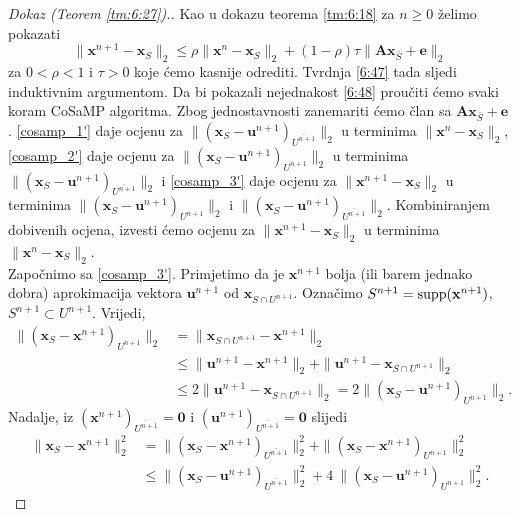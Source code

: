 \documentclass[a4paper,twoside,12pt]{memoir} %
\newcommand{\vect}[1]{\mathbf{#1}}
\renewcommand{\vec}{\vect}
\newcommand{\supp}{\text{\normalfont{supp}}}
\newcommand{\norm}[1]{\|{#1}\|}
\begin{document}
\begin{proof}[Dokaz (Teorem \ref{tm:6:27}).]
    Kao u dokazu teorema \eqref{tm:6:18} za $n \geq 0$ \v{z}elimo pokazati
    \begin{equation}\label{6:48}
        \norm{\vec x^{n+1} - \vec x_S}_2 \leq \rho \norm{\vec x^n - \vec x_S}_2 + (1-\rho)\tau \norm{\vec{Ax}_{\bar S} + \vec e}_2 
    \end{equation}
    za $0< \rho < 1$ i $\tau > 0 $ koje \'cemo kasnije odrediti. Tvrdnja \eqref{6:47} tada sljedi induktivnim argumentom. Da bi pokazali nejednakost \eqref{6:48} prou\v{c}iti \'cemo svaki koram CoSaMP algoritma. Zbog jednostavnosti zanemariti \'cemo \v{c}lan sa $\vec{Ax}_{\bar S} + \vec e$. \eqref{cosamp_1'} daje ocjenu za $\norm{(\vec x_S - \vec u^{n+1})_{\overline{U^{n+1}}}}_2$ u terminima $\norm{\vec x^n - \vec x_S}_2$, \eqref{cosamp_2'} daje ocjenu za $\norm{(\vec x_S - \vec u^{n+1})_{U^{n+1}}}_2$ u terminima $\norm{(\vec x_S - \vec u^{n+1})_{\overline{U^{n+1}}}}_2$ i \eqref{cosamp_3'} daje ocjenu za $\norm{\vec x^{n+1}  - \vec x_S}_2$ u terminima $\norm{(\vec x_S - \vec u^{n+1})_{U^{n+1}}}_2$ i $\norm{(\vec x_S - \vec u^{n+1})_{\overline{U^{n+1}}}}_2$. Kombiniranjem dobivenih ocjena, izvesti \'cemo ocjenu za $\norm{\vec x^{n+1} - \vec x_S}_2$ u terminima $\norm{\vec x^n - \vec x_S}_2$.\\
    \indent
    Zapo\v{c}nimo sa \eqref{cosamp_3'}. Primjetimo da je $\vec x^{n+1}$ bolja (ili barem jednako dobra) aprokimacija vektora $\vec u^{n+1}$ od $\vec x_{S \cap U^{n+1}}$. Ozna\v{c}imo $S^{n+1}= \supp(\vec x^{n+1})$, $S^{n+1} \subset U^{n+1}$. Vrijedi,
    \begin{align*}
        \norm{(\vec x_S - \vec x^{n+1})_{U^{n+1}}}_2 &= \norm{\vec x_{S \cap U^{n+1}} - \vec x^{n+1}}_2\\[0.5em]
        & \leq \norm{\vec u^{n+1} - \vec x^{n+1}}_2 + \norm{\vec u^{n+1} - \vec x_{S \cap U^{n+1}}}_2\\[0.5em]
        & \leq 2 \norm{\vec u^{n+1} - \vec x_{S \cap U^{n+1}}}_2 = 2 \norm{(\vec x_S - \vec u ^{n+1})_{U^{n+1}}}_2.
    \end{align*}
    Nadalje, iz $(\vec x^{n+1})_{\overline{U^{n+1}}} = \vec 0$ i $(\vec u^{n+1})_{\overline{U^{n+1}}} = \vec 0$ slijedi
    \begin{align}
        \norm{\vec x_S - \vec x^{n+1}}_2^2 & = \norm{(\vec x_S - \vec x^{n+1})_{\overline{U^{n+1}}}}_2^2 + \norm{(\vec x_S - \vec x^{n+1})_{U^{n+1}}}_2^2 \nonumber \\[0.5em]
        & \leq \norm{(\vec x_S - \vec u^{n+1})_{\overline{U^{n+1}}}}_2^2 + 4\ \norm{(\vec x_S - \vec u^{n+1})_{U^{n+1}}}_2^2. \label{6:49}

\end{align}
\end{proof}
\end{document}
